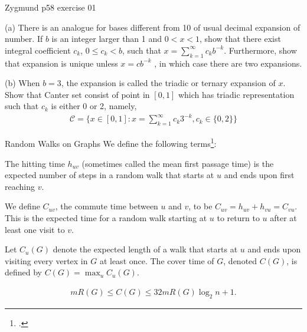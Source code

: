 \documentclass[UTF8,a4paper,10pt]{article}
\begin{document}

  \begin{Problem}[]{Zygmund p58 exercise 01}

    (a) There is an analogue for bases different from 10 of usual decimal expansion of number. If $b$ is an integer larger than 1 and $0 < x < 1$,
    show that there exist integral coefficient $c_k$, $0 \leq c_k < b$, such that $x = \sum_{k=1}^{\infty}c_k b^{-k}$. Furthermore, show that expansion is unique unless
    $x = cb^{-k}$
    , in which case there are two expansions.  


    (b) When $b = 3$, the expansion is called the triadic or ternary
    expansion of $x$. Show that Canter set consist of point in $[0,1]$ which has triadic representation such that $c_k$ is either 0 or 2, namely,
    \begin{equation*}
      \begin{aligned}
        \mathcal{C}  = \{x \in [0, 1] : x =\sum_{k=1}^{\infty}c_k 3^{-k}
, c_k \in \{0, 2\}\}
      \end{aligned}
    \end{equation*}
  \end{Problem}

  \begin{mybox}{Random Walks on Graphs}
    We define the following terms\footcite[][133]{motwani95}:
\begin{definition}
  The hitting time \(h_{uv}\) (sometimes called the mean first passage time) is the expected number of steps in a random walk that starts at \(u\) and ends upon first reaching \(v\).
\end{definition}
\begin{definition}
  We define \(C_{uv}\), the commute time between \(u\) and \(v\), to be \(C_{uv} = h_{uv}+h_{vu} = C_{vu}\). This is the expected time for a random walk starting at \(u\) to return to \(u\) after at least one visit to \(v\).
\end{definition}
\begin{definition}
  Let \(C_u(G)\) denote the expected length of a walk that starts at \(u\) and ends upon visiting every vertex in \(G\) at least once. The cover time of \(G\), denoted \(C(G)\), is defined by \(C(G) = \max_u C_u(G)\).
\end{definition}
  \end{mybox}


  \begin{solution}

    \begin{equation*}
      \begin{aligned}
        mR(G) \leq C(G) \leq 32mR(G) \log_2 n + 1.
      \end{aligned}
    \end{equation*}
 

  \end{solution}
  \pagebreak
\end{document}
